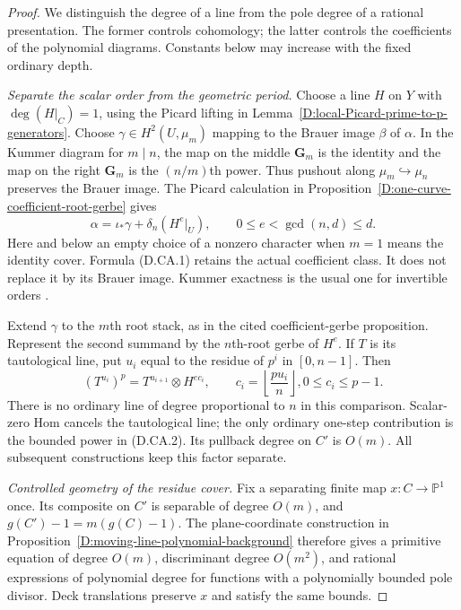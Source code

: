 \begin{proof}
We distinguish the degree of a line from the pole degree of a
rational presentation. The former controls cohomology; the
latter controls the coefficients of the polynomial diagrams.
Constants below may increase with the fixed ordinary depth.

\emph{Separate the scalar order from the geometric period.}
Choose a line $H$ on $Y$ with $\deg(H|_C)=1$, using the
Picard lifting in Lemma~\ref{D:local-Picard-prime-to-p-generators}.
Choose $\gamma\in H^2(U,\mu_m)$ mapping to the Brauer image
$\beta$ of $\alpha$. In the Kummer diagram for $m\mid n$,
the map on the middle $\mathbf G_m$ is the identity and the
map on the right $\mathbf G_m$ is the $(n/m)$th power.
Thus pushout along $\mu_m\hookrightarrow\mu_n$ preserves
the Brauer image. The Picard calculation in
Proposition~\ref{D:one-curve-coefficient-root-gerbe} gives
\[
 \alpha=\iota_*\gamma+\delta_n(H^e|_U),\qquad
       0\leq e<\gcd(n,d)\leq d.                         \tag{D.CA.1}
\]
Here and below an empty choice of a nonzero character when
$m=1$ means the identity cover. Formula (D.CA.1) retains
the actual coefficient class. It does not replace it by its
Brauer image. Kummer exactness is the usual one for invertible
orders \citep[Lemma 59.28.1]{StacksControlledAnchorsD}.

Extend $\gamma$ to the $m$th root stack, as in the cited
coefficient-gerbe proposition. Represent the second summand
by the $n$th-root gerbe of $H^e$. If $T$ is its tautological
line, put $u_i$ equal to the residue of $p^i$ in $[0,n-1]$.
Then
\[
 (T^{u_i})^p=T^{u_{i+1}}\otimes H^{e c_i},\qquad
 c_i=\left\lfloor\frac{p u_i}{n}\right\rfloor,
                         0\leq c_i\leq p-1.             \tag{D.CA.2}
\]
There is no ordinary line of degree proportional to $n$ in
this comparison. Scalar-zero Hom cancels the tautological
line; the only ordinary one-step contribution is the bounded
power in (D.CA.2). Its pullback degree on $C'$ is $O(m)$.
All subsequent constructions keep this factor separate.

\emph{Controlled geometry of the residue cover.}
Fix a separating finite map $x:C\to\mathbb P^1$ once.
Its composite on $C'$ is separable of degree $O(m)$, and
$g(C')-1=m(g(C)-1)$. The plane-coordinate construction in
Proposition~\ref{D:moving-line-polynomial-background} therefore
gives a primitive equation of degree $O(m)$, discriminant
degree $O(m^2)$, and rational expressions of polynomial degree
for functions with a polynomially bounded pole divisor.
Deck translations preserve $x$ and satisfy the same bounds.


\end{proof}
